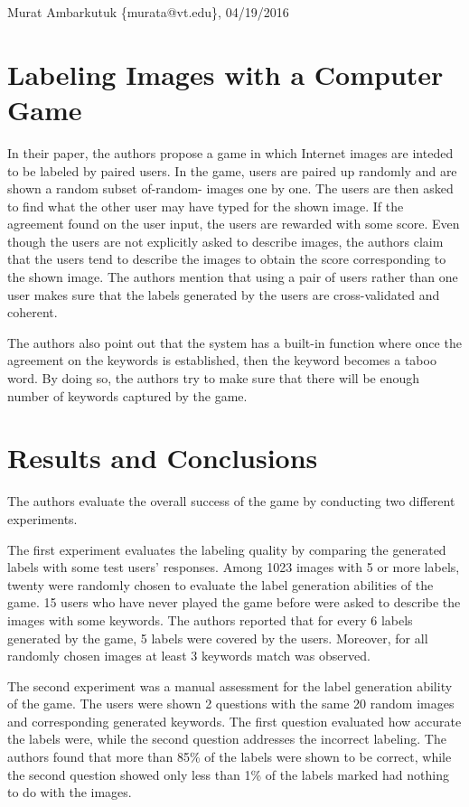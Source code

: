 \documentclass[11pt]{article}
\begin{document}
\thispagestyle{empty}
\begin{flushright}
	\small{Murat Ambarkutuk \{murata@vt.edu\}, 04/19/2016}
\end{flushright}
\section*{Labeling Images with a Computer Game}
In their paper, the authors propose a game in which Internet images are inteded to be labeled by paired users.
In the game, users are paired up randomly and are shown a random subset of-random- images one by one.
The users are then asked to find what the other user may have typed for the shown image.
If the agreement found on the user input, the users are rewarded with some score.
Even though the users are not explicitly asked to describe images, the authors claim that the users tend to describe the images to obtain the score corresponding to the shown image.
The authors mention that using a pair of users rather than one user makes sure that the labels generated by the users are cross-validated and coherent.

The authors also point out that the system has a built-in function where once the agreement on the keywords is established, then the keyword becomes a taboo word.
By doing so, the authors try to make sure that there will be enough number of keywords captured by the game.
\section*{Results and Conclusions}
The authors evaluate the overall success of the game by conducting two different experiments.

The first experiment evaluates the labeling quality by comparing the generated labels with some test users' responses.
Among 1023 images with 5 or more labels, twenty were randomly chosen to evaluate the label generation abilities of the game.
15 users who have never played the game before were asked to describe the images with some keywords.
The authors reported that for every 6 labels generated by the game, 5 labels were covered by the users.
Moreover, for all randomly chosen images at least 3 keywords match was observed.

The second experiment was a manual assessment for the label generation ability of the game.
The users were shown 2 questions with the same 20 random images and corresponding generated keywords.
The first question evaluated how accurate the labels were, while the second question addresses the incorrect labeling.
The authors found that more than 85\% of the labels were shown to be correct, while the second question showed only less than 1\% of the labels marked had nothing to do with the images.
\end{document}
